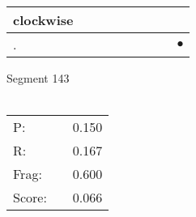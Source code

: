 \documentclass[landscape]{article}
\newcommand{\ssp}{\hspace{2pt}}
\newcommand{\mex}{\cellcolor{g}$\bullet$}
\begin{document}
\begin{tabular}{|l|p{10pt}|p{10pt}|p{10pt}|p{10pt}|p{10pt}|p{10pt}|p{10pt}|p{10pt}|}
\hline
\ssp clockwise \ssp&\hspace{2pt}&\hspace{2pt}&\hspace{2pt}&\hspace{2pt}&\hspace{2pt}&\hspace{2pt}&\hspace{2pt}&\hspace{2pt}\\
\hline
\ssp \cellcolor{ref7}. \ssp&\hspace{2pt}&\hspace{2pt}&\hspace{2pt}&\hspace{2pt}&\hspace{2pt}&\hspace{2pt}&\hspace{2pt}&\hspace{2pt}\mex\\
\hline
\end{tabular}

\vspace{6pt}
\noindent Segment 143\\\\
\noindent\begin{tabular}{lm{12pt}r}
\hline
P:&&0.150\\
R:&&0.167\\
Frag:&&0.600\\
Score:&&0.066\\
\end{tabular}

\newpage
\end{document}
